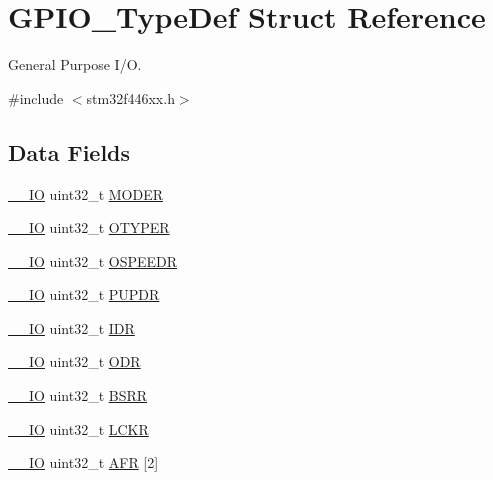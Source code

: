 \hypertarget{struct_g_p_i_o___type_def}{}\section{G\+P\+I\+O\+\_\+\+Type\+Def Struct Reference}
\label{struct_g_p_i_o___type_def}


General Purpose I/O.  




{\ttfamily \#include $<$stm32f446xx.\+h$>$}

\subsection*{Data Fields}
\begin{DoxyCompactItemize}
\item 
\mbox{\hyperlink{core__sc300_8h_aec43007d9998a0a0e01faede4133d6be}{\+\_\+\+\_\+\+IO}} uint32\+\_\+t \mbox{\hyperlink{struct_g_p_i_o___type_def_a2b671a94c63a612f81e0e9de8152d01c}{M\+O\+D\+ER}}
\item 
\mbox{\hyperlink{core__sc300_8h_aec43007d9998a0a0e01faede4133d6be}{\+\_\+\+\_\+\+IO}} uint32\+\_\+t \mbox{\hyperlink{struct_g_p_i_o___type_def_a9543592bda60cb5261075594bdeedac9}{O\+T\+Y\+P\+ER}}
\item 
\mbox{\hyperlink{core__sc300_8h_aec43007d9998a0a0e01faede4133d6be}{\+\_\+\+\_\+\+IO}} uint32\+\_\+t \mbox{\hyperlink{struct_g_p_i_o___type_def_a328d16cc6213783ede54e4059ffd50a3}{O\+S\+P\+E\+E\+DR}}
\item 
\mbox{\hyperlink{core__sc300_8h_aec43007d9998a0a0e01faede4133d6be}{\+\_\+\+\_\+\+IO}} uint32\+\_\+t \mbox{\hyperlink{struct_g_p_i_o___type_def_abeed38529bd7b8de082e490e5d4f1727}{P\+U\+P\+DR}}
\item 
\mbox{\hyperlink{core__sc300_8h_aec43007d9998a0a0e01faede4133d6be}{\+\_\+\+\_\+\+IO}} uint32\+\_\+t \mbox{\hyperlink{struct_g_p_i_o___type_def_a328d2fe9ef1d513c3a97d30f98f0047c}{I\+DR}}
\item 
\mbox{\hyperlink{core__sc300_8h_aec43007d9998a0a0e01faede4133d6be}{\+\_\+\+\_\+\+IO}} uint32\+\_\+t \mbox{\hyperlink{struct_g_p_i_o___type_def_abff7fffd2b5a718715a130006590c75c}{O\+DR}}
\item 
\mbox{\hyperlink{core__sc300_8h_aec43007d9998a0a0e01faede4133d6be}{\+\_\+\+\_\+\+IO}} uint32\+\_\+t \mbox{\hyperlink{struct_g_p_i_o___type_def_ac25dd6b9e3d55e17589195b461c5ec80}{B\+S\+RR}}
\item 
\mbox{\hyperlink{core__sc300_8h_aec43007d9998a0a0e01faede4133d6be}{\+\_\+\+\_\+\+IO}} uint32\+\_\+t \mbox{\hyperlink{struct_g_p_i_o___type_def_a2612a0f4b3fbdbb6293f6dc70105e190}{L\+C\+KR}}
\item 
\mbox{\hyperlink{core__sc300_8h_aec43007d9998a0a0e01faede4133d6be}{\+\_\+\+\_\+\+IO}} uint32\+\_\+t \mbox{\hyperlink{struct_g_p_i_o___type_def_ab67c1158c04450d19ad483dcd2192e43}{A\+FR}} \mbox{[}2\mbox{]}
\end{DoxyCompactItemize}


